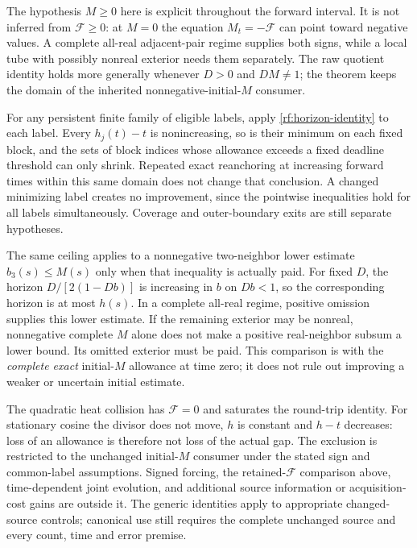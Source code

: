 The hypothesis $M\ge0$ here is explicit throughout the forward
interval. It is not inferred from $\mathcal F\ge0$: at $M=0$ the
equation $M_t=-\mathcal F$ can point toward negative values. A complete
all-real adjacent-pair regime supplies both signs, while a local tube
with possibly nonreal exterior needs them separately. The raw quotient
identity holds more generally whenever $D>0$ and $DM\ne1$; the theorem
keeps the domain of the inherited nonnegative-initial-$M$ consumer.

For any persistent finite family of eligible labels, apply
\eqref{rf:horizon-identity} to each label. Every $h_j(t)-t$ is
nonincreasing, so is their minimum on each fixed block, and the sets of
block indices whose allowance exceeds a fixed deadline threshold can
only shrink. Repeated exact reanchoring at increasing forward times
within this same domain does not change that conclusion. A changed
minimizing label creates no improvement, since the pointwise inequalities
hold for all labels simultaneously. Coverage and outer-boundary exits
are still separate hypotheses.

The same ceiling applies to a nonnegative two-neighbor lower estimate
$b_3(s)\le M(s)$ only when that inequality is actually paid. For fixed
$D$, the horizon $D/[2(1-Db)]$ is increasing in $b$ on $Db<1$, so the
corresponding horizon is at most $h(s)$. In a complete all-real regime,
positive omission supplies this lower estimate. If the remaining exterior
may be nonreal, nonnegative complete $M$ alone does not make a positive
real-neighbor subsum a lower bound. Its omitted exterior must be paid.
This comparison is with the \emph{complete exact} initial-$M$ allowance
at time zero; it does not rule out improving a weaker or uncertain
initial estimate.

The quadratic heat collision has $\mathcal F=0$ and saturates the
round-trip identity. For stationary cosine the divisor does not move,
$h$ is constant and $h-t$ decreases: loss of an allowance is therefore
not loss of the actual gap. The exclusion is restricted to the unchanged
initial-$M$ consumer under the stated sign and common-label assumptions.
Signed forcing, the retained-$\mathcal F$ comparison above, time-dependent
joint evolution, and additional source information or acquisition-cost
gains are outside it. The generic identities apply to appropriate
changed-source controls; canonical use still requires the complete
unchanged source and every count, time and error premise.
